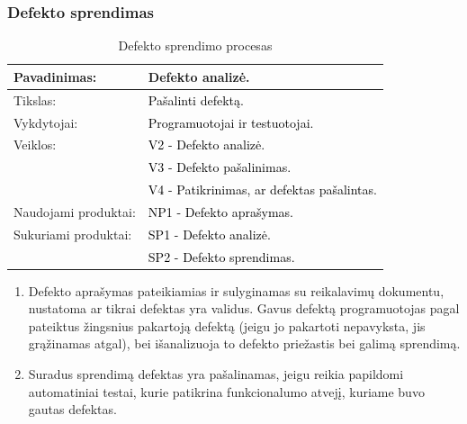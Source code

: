 \documentclass{VUMIFPSkursinis}
\begin{document}
	\subsubsection{Defekto sprendimas}
	\begin{center}
		\begin{table}[ht]
			\caption{Defekto sprendimo procesas}
			\begin{tabular}{ | l | l | }
				\hline
				Pavadinimas:         & Defekto analizė.				\\ \hline
				Tikslas:             & \textcolor{black}{Pašalinti defektą.}				\\ \hline
				Vykdytojai:          & \textcolor{black}{ Programuotojai ir testuotojai.	}	\\ \hline
				Veiklos:             & \textcolor{black}{V2 - Defekto analizė.}				\\
				                     & \textcolor{black}{V3 - Defekto pašalinimas.}			\\
				                     & \textcolor{black}{V4 - Patikrinimas, ar defektas pašalintas.}	\\ \hline
				Naudojami produktai: & \textcolor{black}{NP1 - Defekto aprašymas.}			\\ \hline
				Sukuriami produktai: & \textcolor{black}{SP1 - Defekto analizė.	}		\\
				                     & \textcolor{black}{SP2 - Defekto sprendimas.}			\\ \hline
			\end{tabular}
		\end{table}
	\end{center}
	\begin{enumerate}
		\item{
			Defekto aprašymas pateikiamias ir sulyginamas su reikalavimų dokumentu, nustatoma ar tikrai defektas yra validus.
			Gavus defektą programuotojas pagal pateiktus žingsnius pakartoją defektą (jeigu jo pakartoti nepavyksta, jis grąžinamas atgal), bei išanalizuoja to defekto priežastis bei galimą sprendimą.}
		\item{
			Suradus sprendimą defektas yra pašalinamas, jeigu reikia papildomi automatiniai testai, kurie patikrina funkcionalumo atvejį, kuriame buvo gautas defektas.
		}
	\end{enumerate}
\end{document}
